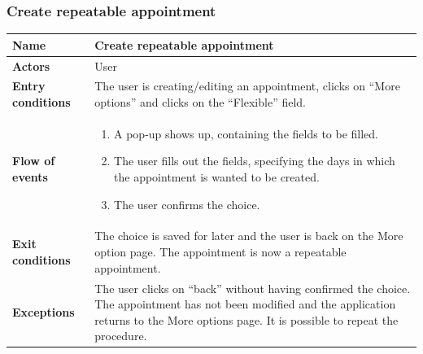\subsubsection{Create repeatable appointment}
\begin{table}[!h]
	\centering
	{\renewcommand{\arraystretch}{2}%
		\begin{tabular}{|l|p{12cm}|}
			\hline
			\textbf{Name} 				& \textbf{Create repeatable appointment} \\ \hline
			\textbf{Actors} 			& User \\ \hline
			\textbf{Entry conditions} 	& The user is creating/editing an appointment, clicks on “More options” and clicks on the “Flexible” field. \\ \hline
			\textbf{Flow of events}		& \begin{minipage}[t]{0.75\textwidth}
				\begin{enumerate}
					\item A pop-up shows up, containing the fields to be filled.
					\item The user fills out the fields, specifying the days in which the appointment is wanted to be created.
					\item The user confirms the choice.
				\end{enumerate}
			\end{minipage}	\\ \hline
			\textbf{Exit conditions}	& The choice is saved for later and the user is back on the More option page. The appointment is now a repeatable appointment.  \\ \hline
			\textbf{Exceptions}			& The user clicks on “back” without having confirmed the choice. The appointment has not been modified and the application returns to the More options page. It is possible to repeat the procedure.  \\ \hline
	\end{tabular}}
\end{table}
\clearpage

